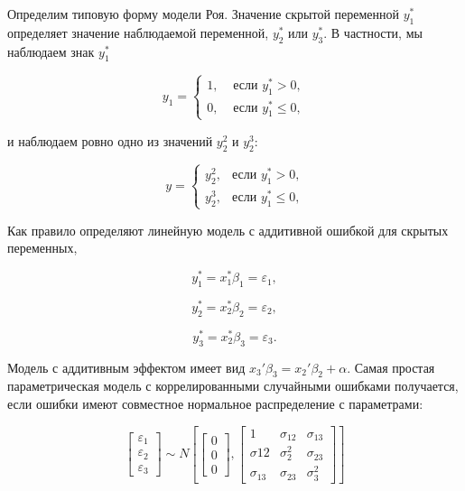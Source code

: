 Определим типовую форму модели Роя. Значение скрытой переменной $y^* _1$ определяет значение наблюдаемой переменной, $y^*_2$ или $y^*_3$. В частности, мы наблюдаем знак $y_1^{*}$

\begin{equation}
y_1=
\begin{cases}
	1, & \text{ если } y_1^{*}>0, \\
	0, & \text{ если } y_1^{*}\leq0,
\end{cases}
\end{equation}

и наблюдаем ровно одно из значений $y_2^{2}$ и $y_2^{3}$:

\begin{equation}
y=
\begin{cases}
	y_2^{2}, & \text{если $y_1^{*}>0$,} \\
	y_2^{3}, & \text{если $y_1^{*}\leq0$,}
\end{cases}
\end{equation}

Как правило определяют линейную модель с аддитивной ошибкой для скрытых переменных,

\begin{equation}
y_1^{*}=x_1^{*}\beta_1=\varepsilon_1,
\end{equation}

\[
y_2^{*}=x_2^{*}\beta_2=\varepsilon_2,
\]

\[
y_3^{*}=x_2^{*}\beta_3=\varepsilon_3.
\]

Модель с аддитивным эффектом имеет вид $x_3'\beta_3=x_2'\beta_2+\alpha$. Самая простая параметрическая модель с коррелированными случайными ошибками получается, если ошибки имеют совместное нормальное распределение с параметрами:

\begin{equation}
\begin{bmatrix}
\varepsilon_1 \\ \varepsilon_2 \\ \varepsilon_3
\end{bmatrix}
 \sim N
\left[
	\begin{bmatrix}
	0 \\ 0 \\ 0
	\end{bmatrix},
	\begin{bmatrix}
	1 & \sigma_{12} & \sigma_{13} \\
	\sigma{12} & \sigma_2^{2} & \sigma_{23} \\
	\sigma_{13} & \sigma_{23} & \sigma_3^2
	\end{bmatrix}
\right]
\end{equation}


